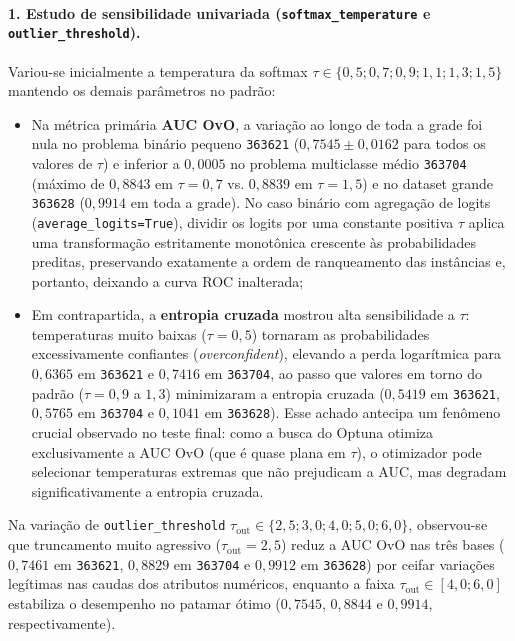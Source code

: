 \documentclass[11pt,a4paper]{article}
\begin{document}
\paragraph{1. Estudo de sensibilidade univariada (\texttt{softmax\_temperature} e \texttt{outlier\_threshold}).}
Variou-se inicialmente a temperatura da softmax $\tau \in \{0{,}5; 0{,}7; 0{,}9; 1{,}1; 1{,}3; 1{,}5\}$ mantendo os demais parâmetros no padrão:
\begin{itemize}[leftmargin=2em]
    \item Na métrica primária \textbf{AUC OvO}, a variação ao longo de toda a grade foi nula no problema binário pequeno \texttt{363621} ($0{,}7545 \pm 0{,}0162$ para todos os valores de $\tau$) e inferior a $0{,}0005$ no problema multiclasse médio \texttt{363704} (máximo de $0{,}8843$ em $\tau = 0{,}7$ vs. $0{,}8839$ em $\tau = 1{,}5$) e no dataset grande \texttt{363628} ($0{,}9914$ em toda a grade). No caso binário com agregação de logits (\texttt{average\_logits=True}), dividir os logits por uma constante positiva $\tau$ aplica uma transformação estritamente monotônica crescente às probabilidades preditas, preservando exatamente a ordem de ranqueamento das instâncias e, portanto, deixando a curva ROC inalterada;
    \item Em contrapartida, a \textbf{entropia cruzada} mostrou alta sensibilidade a $\tau$: temperaturas muito baixas ($\tau = 0{,}5$) tornaram as probabilidades excessivamente confiantes (\emph{overconfident}), elevando a perda logarítmica para $0{,}6365$ em \texttt{363621} e $0{,}7416$ em \texttt{363704}, ao passo que valores em torno do padrão ($\tau = 0{,}9$ a $1{,}3$) minimizaram a entropia cruzada ($0{,}5419$ em \texttt{363621}, $0{,}5765$ em \texttt{363704} e $0{,}1041$ em \texttt{363628}). Esse achado antecipa um fenômeno crucial observado no teste final: como a busca do Optuna otimiza exclusivamente a AUC OvO (que é quase plana em $\tau$), o otimizador pode selecionar temperaturas extremas que não prejudicam a AUC, mas degradam significativamente a entropia cruzada.
\end{itemize}
Na variação de \texttt{outlier\_threshold} $\tau_{\mathrm{out}} \in \{2{,}5; 3{,}0; 4{,}0; 5{,}0; 6{,}0\}$, observou-se que truncamento muito agressivo ($\tau_{\mathrm{out}} = 2{,}5$) reduz a AUC OvO nas três bases ($0{,}7461$ em \texttt{363621}, $0{,}8829$ em \texttt{363704} e $0{,}9912$ em \texttt{363628}) por ceifar variações legítimas nas caudas dos atributos numéricos, enquanto a faixa $\tau_{\mathrm{out}} \in [4{,}0; 6{,}0]$ estabiliza o desempenho no patamar ótimo ($0{,}7545$, $0{,}8844$ e $0{,}9914$, respectivamente).
\end{document}
